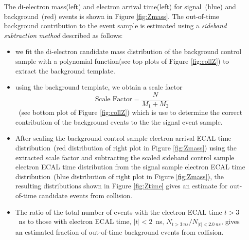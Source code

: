 \vspace{5mm}
The di-electron mass(left) and electron arrival time(left) for signal~(blue) and background~(red) events is shown in Figure \ref{fig:Zmass}. The out-of-time background contribution to the \PZ event sample is estimated using a \textit{sideband subtraction method} described as follows:
\begin{itemize}
\item we fit the di-electron candidate mass distribution of the background control sample with a polynomial function(see top plots of Figure  \ref{fig:collZ}) to extract the background template.
\item using the background template, we obtain a scale factor $$\displaystyle{\mbox{Scale Factor} = \frac{N}{M_{1} + M_{2}}}$$~(see bottom plot of Figure \ref{fig:collZ}) which is use to determine the correct contribution of the background events to the the signal event sample.
\item After scaling the background control sample electron arrival ECAL time distribution~(red distribution of right plot in Figure \ref{fig:Zmass}) using the extracted scale factor and subtracting the scaled sideband control sample electron ECAL time distribution from the signal sample  electron ECAL time distribution~(blue distribution of right plot in Figure \ref{fig:Zmass}), the resulting distributions shown in Figure \ref{fig:Ztime} gives an estimate for out-of-time candidate events from collision.
\item The ratio of the total number of events with the electron ECAL time $t > 3$~ns to those with electron ECAL time, $|t| < 2$~ns, \ie $ N_{t > 3~ns}/ N_{|t| < 2.0~ns}$, gives an estimated fraction of out-of-time background events from collision. 
\end{itemize}  

